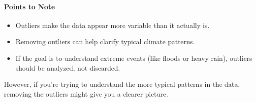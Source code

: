 \paragraph{Points to Note}

\begin{itemize}
  \item Outliers make the data appear more variable than it actually is.
  \item Removing outliers can help clarify typical climate patterns.
  \item If the goal is to understand extreme events (like floods or heavy rain), outliers should be analyzed, not discarded.
\end{itemize}
However, if you’re trying to understand the more typical patterns in the data, removing the outliers might give you a clearer picture.

\clearpage
